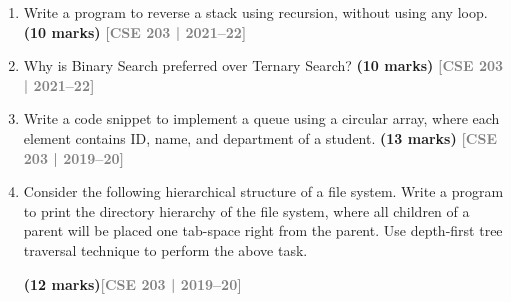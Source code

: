 \documentclass[12pt,a3paper]{article}
\newcommand{\yr}[1]{\hfill\textcolor{gray}{\small\textbf{[#1]}}}
\newcommand{\mk}[1]{\textcolor{orange!70!black}{\small\textbf{(#1 marks)}}}
\begin{document}
\begin{enumerate}
\begin{center}

\smallskip
\end{center}

The above list should be converted to
$10 \to 5 \to 12 \to 7 \to 11 \to 4 \to 20 \to 13 \to 17
\to 6 \to 2 \to 16 \to 9 \to 8 \to 3 \to 19 \to 15$. \mk{15}\yr{CSE 203 | 2021--22}

\item Write a program to reverse a stack using recursion, without using any loop. \mk{10}
\yr{CSE 203 | 2021--22}

\item Why is Binary Search preferred over Ternary Search? \mk{10}
\yr{CSE 203 | 2021--22}

\item Write a code snippet to implement a queue using a circular array, where
each element contains ID, name, and department of a student. \mk{13}
\yr{CSE 203 | 2019--20}

\item Consider the following hierarchical structure of a file system. Write a
program to print the directory hierarchy of the file system, where all children
of a parent will be placed one tab-space right from the parent. Use depth-first
tree traversal technique to perform the above task.

\begin{center}
\end{center}
\mk{12}\yr{CSE 203 | 2019--20}


\end{enumerate}
\end{document}
